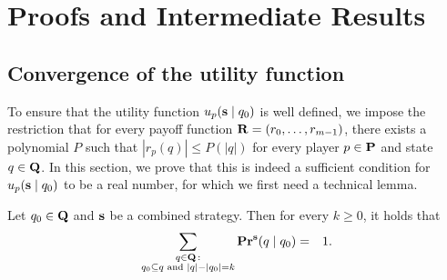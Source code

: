 
\section{Proofs and Intermediate Results}
\subsection{Convergence of the utility function}
\label{sec-conver}

To ensure that the utility function $u_p(\mathbf{s} \mid q_0)$ is well defined, we impose the restriction that for every payoff function $\mathbf{R} = (r_0, \ldots, r_{m-1})$, there exists a polynomial $P$ such that $|r_p(q)| \leq P(|q|)$ for every player $p \in \mathbf{P}$ and state $q \in \mathbf{Q}$. In this section, we prove that this is indeed a sufficient condition for $u_p(\mathbf{s} \mid q_0)$ to be a real number, for which we first need a technical lemma. 

\begin{mylem}\label{lem-prop-k}
Let $q_0 \in \mathbf{Q}$ and $\mathbf{s}$ be a combined strategy. Then for every $k \geq 0$, it holds that
\begin{eqnarray*}
\sum_{\substack{q \in \mathbf{Q} \,: \\ q_0 \subseteq q \text{ {\rm and} } |q| - |q_0| = k}} \mathbf{Pr}^{\mathbf{s}}(q \mid q_0) & = & 1.
\end{eqnarray*}
\end{mylem}

